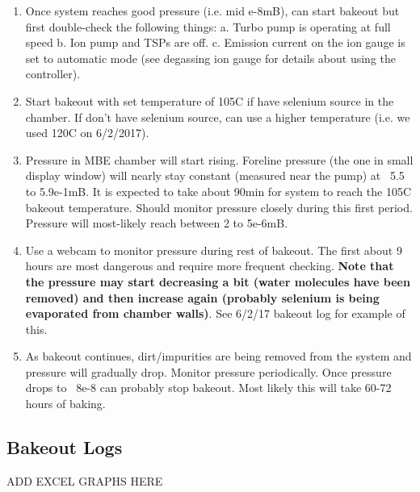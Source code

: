 \begin{enumerate}
\item	Once system reaches good pressure (i.e. mid e-8mB), can start bakeout but first double-check the following things:
a.	Turbo pump is operating at full speed
b.	Ion pump and TSPs are off.
c.	Emission current on the ion gauge is set to automatic mode (see degassing ion gauge for details about using the controller).
\item	Start bakeout with set temperature of 105C if have selenium source in the chamber. If don't have selenium source, can use a higher temperature (i.e. we used 120C on 6/2/2017).
\item	Pressure in MBE chamber will start rising. Foreline pressure (the one in small display window) will nearly stay constant (measured near the pump) at ~5.5 to 5.9e-1mB. It is expected to take about 90min for system to reach the 105C bakeout temperature. Should monitor pressure closely during this first period. Pressure will most-likely reach between 2 to 5e-6mB. 
\item Use a webcam to monitor pressure during rest of bakeout. The first about 9 hours are most dangerous and require more frequent checking. \textbf{Note that the pressure may start decreasing a bit (water molecules have been removed) and then increase again (probably selenium is being evaporated from chamber walls)}. See 6/2/17 bakeout log for example of this.
\item	As bakeout continues, dirt/impurities are being removed from the system and pressure will gradually drop. Monitor pressure periodically. Once pressure drops to ~8e-8 can probably stop bakeout. Most likely this will take 60-72 hours of baking.
\end{enumerate}

\subsection{Bakeout Logs}
ADD EXCEL GRAPHS HERE

